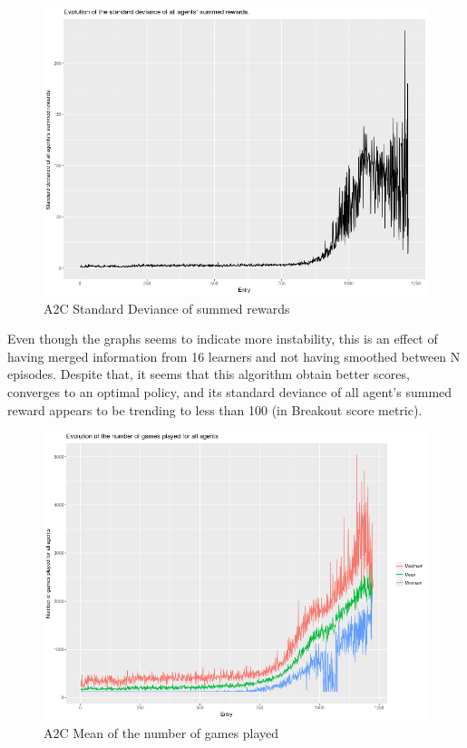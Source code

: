 \documentclass[11pt,twoside,a4paper]{article}
\begin{document}
\begin{figure}[H]
  \includegraphics[scale=0.35]{log-analysis/a2c-sd-summed-rewards.png}
  \centering
  \caption{A2C Standard Deviance of summed rewards}
  \label{fig:a2c-sd-summed-rewards}
\end{figure}

Even though the graphs seems to indicate more instability, this is an effect of
having merged information from 16 learners and not having smoothed between N
episodes. Despite that, it seems that this algorithm obtain better scores,
converges to an optimal policy, and its standard deviance of all agent's summed
reward appears to be trending to less than 100 (in Breakout score metric).

\begin{figure}[H]
  \includegraphics[scale=0.35]{log-analysis/a2c-mean-ngp.png}
  \centering
  \caption{A2C Mean of the number of games played}
  \label{fig:a2c-mean-ngp}
\end{figure}
\end{document}
